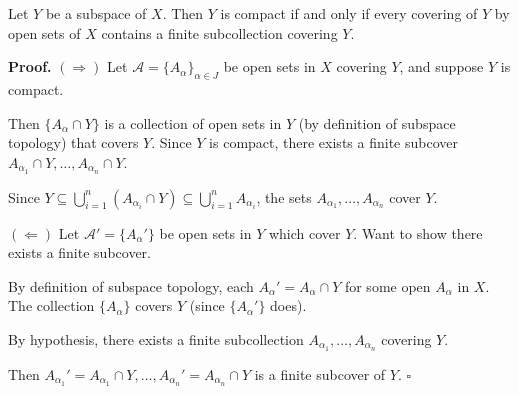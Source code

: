 \documentclass[11pt]{report}
\renewenvironment{proof}[1][Proof]{\noindent\textbf{#1.} }{\hfill$\square$\par\vspace{5pt}}
\begin{document}
\begin{lembox}
Let $Y$ be a subspace of $X$. Then $Y$ is compact if and only if every covering of $Y$ by open sets of $X$ contains a finite subcollection covering $Y$.
\end{lembox}

\begin{proof}
$(\Rightarrow)$ Let $\mathcal{A} = \{A_\alpha\}_{\alpha \in J}$ be open sets in $X$ covering $Y$, and suppose $Y$ is compact.

Then $\{A_\alpha \cap Y\}$ is a collection of open sets in $Y$ (by definition of subspace topology) that covers $Y$. Since $Y$ is compact, there exists a finite subcover $A_{\alpha_1} \cap Y, \ldots, A_{\alpha_n} \cap Y$.

Since $Y \subseteq \bigcup_{i=1}^n (A_{\alpha_i} \cap Y) \subseteq \bigcup_{i=1}^n A_{\alpha_i}$, the sets $A_{\alpha_1}, \ldots, A_{\alpha_n}$ cover $Y$.

$(\Leftarrow)$ Let $\mathcal{A}' = \{A_\alpha'\}$ be open sets in $Y$ which cover $Y$. Want to show there exists a finite subcover.

By definition of subspace topology, each $A_\alpha' = A_\alpha \cap Y$ for some open $A_\alpha$ in $X$. The collection $\{A_\alpha\}$ covers $Y$ (since $\{A_\alpha'\}$ does).

By hypothesis, there exists a finite subcollection $A_{\alpha_1}, \ldots, A_{\alpha_n}$ covering $Y$.

Then $A_{\alpha_1}' = A_{\alpha_1} \cap Y, \ldots, A_{\alpha_n}' = A_{\alpha_n} \cap Y$ is a finite subcover of $Y$.
\end{proof}
\end{document}
